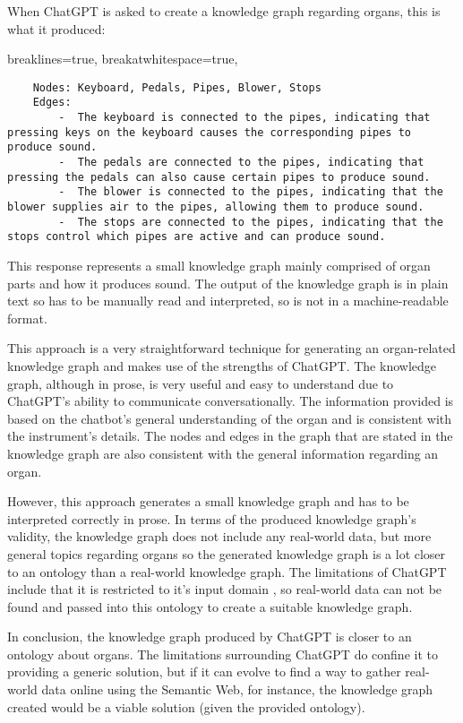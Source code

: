 When ChatGPT is asked to create a knowledge graph regarding organs, this is what it produced:

\lstset
{
    breaklines=true,
    breakatwhitespace=true,
}
\begin{lstlisting}
    Nodes: Keyboard, Pedals, Pipes, Blower, Stops
    Edges:
        -  The keyboard is connected to the pipes, indicating that pressing keys on the keyboard causes the corresponding pipes to produce sound.
        -  The pedals are connected to the pipes, indicating that pressing the pedals can also cause certain pipes to produce sound.
        -  The blower is connected to the pipes, indicating that the blower supplies air to the pipes, allowing them to produce sound.
        -  The stops are connected to the pipes, indicating that the stops control which pipes are active and can produce sound.
\end{lstlisting}

This response represents a small knowledge graph mainly comprised of organ parts and how it produces sound. The output of the knowledge graph is in plain text so has to be manually read and interpreted, so is not in a machine-readable format. 

This approach is a very straightforward technique for generating an organ-related knowledge graph and makes use of the strengths of ChatGPT. The knowledge graph, although in prose, is very useful and easy to understand due to ChatGPT's ability to communicate conversationally. The information provided is based on the chatbot's general understanding of the organ and is consistent with the instrument's details. The nodes and edges in the graph that are stated in the knowledge graph are also consistent with the general information regarding an organ. 

However, this approach generates a small knowledge graph and has to be interpreted correctly in prose. In terms of the produced knowledge graph's validity, the knowledge graph does not include any real-world data, but more general topics regarding organs so the generated knowledge graph is a lot closer to an ontology than a real-world knowledge graph. The limitations of ChatGPT include that it is restricted to it's input domain \cite{chatgptwebsite}, so real-world data can not be found and passed into this ontology to create a suitable knowledge graph. 

In conclusion, the knowledge graph produced by ChatGPT is closer to an ontology about organs. The limitations surrounding ChatGPT do confine it to providing a generic solution, but if it can evolve to find a way to gather real-world data online using the Semantic Web, for instance, the knowledge graph created would be a viable solution (given the provided ontology).

